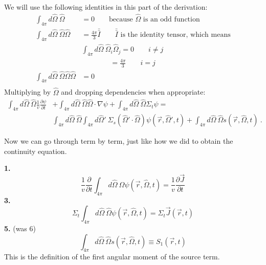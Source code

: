 \documentclass[12pt]{article}
\newcommand{\vOmega}{\ensuremath{\hat{\Omega}}}
\begin{document}
We will use the following identities in this part of the derivation:
\begin{align*} 
\int_{4\pi} d\vOmega \:\vOmega &= 0 \qquad \text{because }\vOmega\text{ is an odd function} \\
%
\int_{4\pi} d\vOmega\: \vOmega \vOmega &= \frac{4\pi}{3}\bar{\bar{I}} \qquad \bar{\bar{I}}\text{ is the identity tensor, which means} \\
%
&\int_{4\pi} d\vOmega\: \vOmega_i \vOmega_j = 0 \qquad i \neq j \nonumber \\
&\qquad \qquad = \frac{4\pi}{3} \qquad i = j \nonumber \\
%
\int_{4\pi} d\vOmega \: \vOmega \vOmega \vOmega &= 0 \qquad \\
\end{align*}
%
Multiplying by $\vOmega$ and dropping dependencies when appropriate:
%
\begin{align*}
\int_{4\pi} d\vOmega\: \vOmega \frac{1}{v}\frac{\partial \psi}{\partial t} &+ 
\int_{4\pi} d\vOmega\: \vOmega \vOmega \cdot \nabla \psi + 
\int_{4\pi} d\vOmega\: \vOmega \Sigma_t \psi =\nonumber \\
&\int_{4\pi} d\vOmega\: \vOmega \int_{4\pi} d\vOmega'\: \Sigma_s(\vOmega' \cdot \vOmega) \psi(\vec{r}, \vOmega', t) +
\int_{4\pi} d\vOmega\: \vOmega s(\vec{r}, \vOmega, t)\:.
\end{align*}

Now we can go through term by term, just like how we did to obtain the continuity equation.

\textbf{1.}
\begin{equation}
\frac{1}{v}\frac{\partial}{\partial t} \int_{4\pi} d\vOmega\: \vOmega \psi(\vec{r}, \vOmega, t) = \boxed{\frac{1}{v}\frac{\partial \vec{J}}{\partial t}} \nonumber
\end{equation}
\textbf{3.} 
\begin{equation}
\Sigma_t \int_{4\pi} d\vOmega\: \vOmega \psi(\vec{r}, \vOmega, t) = \boxed{\Sigma_t  \vec{J}(\vec{r}, t)} \nonumber
\end{equation}
\textbf{5.} (was 6)
\begin{equation}
\int_{4\pi} d\vOmega\: \vOmega s(\vec{r}, \vOmega, t) \equiv \boxed{S_{1}(\vec{r}, t)}  \nonumber
\end{equation}
This is the definition of the first angular moment of the source term. 
\end{document}
